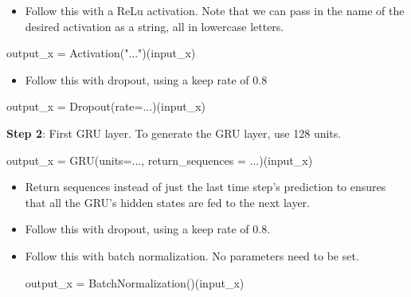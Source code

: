 \documentclass[11pt]{article}
\newenvironment{Shaded}{}{}
\newcommand{\StringTok}[1]{\textcolor[rgb]{0.25,0.44,0.63}{{#1}}}
\newcommand{\NormalTok}[1]{{#1}}
\begin{document}
\begin{itemize}
\itemsep1pt\parskip0pt
\item
  Follow this with a ReLu activation. Note that we can pass in the name
  of the desired activation as a string, all in lowercase letters.
\end{itemize}

\begin{Shaded}
\begin{Highlighting}[]
\NormalTok{output_x = Activation(}\StringTok{"..."}\NormalTok{)(input_x)}
\end{Highlighting}
\end{Shaded}

\begin{itemize}
\itemsep1pt\parskip0pt
\item
  Follow this with dropout, using a keep rate of 0.8
\end{itemize}

\begin{Shaded}
\begin{Highlighting}[]
\NormalTok{output_x = Dropout(rate=...)(input_x)}
\end{Highlighting}
\end{Shaded}

\textbf{Step 2}: First GRU layer. To generate the GRU layer, use 128
units.

\begin{Shaded}
\begin{Highlighting}[]
\NormalTok{output_x = GRU(units=..., return_sequences = ...)(input_x)}
\end{Highlighting}
\end{Shaded}

\begin{itemize}
\item
  Return sequences instead of just the last time step's prediction to
  ensures that all the GRU's hidden states are fed to the next layer.
\item
  Follow this with dropout, using a keep rate of 0.8.
\item
  Follow this with batch normalization. No parameters need to be set.

\begin{Shaded}
\begin{Highlighting}[]
\NormalTok{output_x = BatchNormalization()(input_x)}
\end{Highlighting}
\end{Shaded}
\end{itemize}
\end{document}
